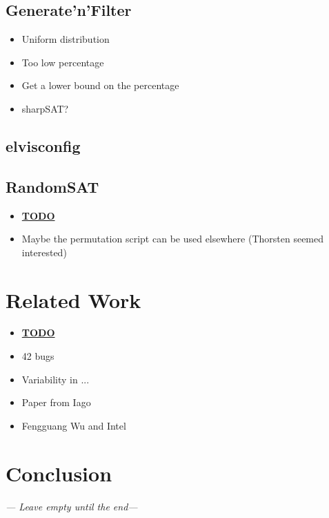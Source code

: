 \documentclass[a4paper,11pt]{report}
\begin{document}
\section{Generate'n'Filter}



\begin{itemize}
    \item Uniform distribution
    \item Too low percentage
    \item Get a lower bound on the percentage
    \item sharpSAT?
\end{itemize}

\section{elvisconfig}


\section{RandomSAT}


\begin{itemize}
    \item \underline{\textbf{TODO}}
    \item Maybe the permutation script can be used elsewhere (Thorsten seemed 
        interested)
\end{itemize}



\newpage
\chapter{Related Work}

\begin{itemize}
    \item \textbf{\underline{TODO}}
    \item 42 bugs
    \item Variability in ...
    \item Paper from Iago
    \item Fengguang Wu and Intel
\end{itemize}



\newpage
\chapter{Conclusion}
\emph{--- Leave empty until the end---}




\newpage


\end{document}
